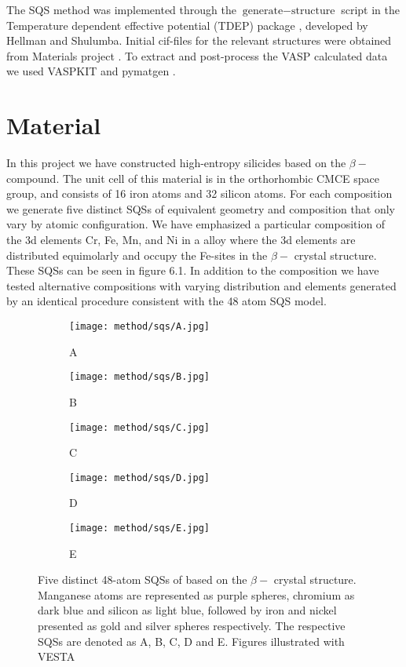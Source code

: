The SQS method was implemented through the $\text{generate}-\text{structure}$ script in the Temperature dependent effective potential (TDEP) package \cite{tdep}, developed by Hellman and Shulumba. Initial cif-files for the relevant structures were obtained from Materials project \cite{Jain2013}. To extract and post-process the VASP calculated data we used VASPKIT \cite{vaspkit} and pymatgen \cite{pymatgen}. 


\section{Material}
In this project we have constructed high-entropy silicides based on the $\beta-$  compound. The unit cell of this material is in the orthorhombic CMCE space group, and consists of 16 iron atoms and 32 silicon atoms. For each composition we generate five distinct SQSs of equivalent geometry and composition that only vary by atomic configuration. We have emphasized a particular composition of the 3d elements Cr, Fe, Mn, and Ni in a  alloy where the 3d elements are distributed equimolarly and occupy the Fe-sites in the $\beta-$  crystal structure. These SQSs can be seen in figure 6.1. In addition to the  composition we have tested alternative compositions with varying distribution and elements generated by an identical procedure consistent with the 48 atom SQS model.

\begin{figure}[H]
\begin{subfigure}{0.5\textwidth}
\texttt{[image: method/sqs/A.jpg]}
\caption{A}
\end{subfigure}
\hfill
\begin{subfigure}{0.5\textwidth}
\texttt{[image: method/sqs/B.jpg]}
\caption{B}
\end{subfigure}
\begin{subfigure}{0.5\textwidth}
\texttt{[image: method/sqs/C.jpg]}
\caption{C}
\end{subfigure}
\hfill
\begin{subfigure}{0.5\textwidth}
\texttt{[image: method/sqs/D.jpg]}
\caption{D}
\end{subfigure}
\begin{subfigure}{0.5\textwidth}
\texttt{[image: method/sqs/E.jpg]}
\caption{E}
\end{subfigure}
\caption{Five distinct 48-atom SQSs of  based on the $\beta-$  crystal structure. Manganese atoms are represented as purple spheres, chromium as dark blue and silicon as light blue, followed by iron and nickel presented as gold and silver spheres respectively. The respective SQSs are denoted as A, B, C, D and E. Figures illustrated with VESTA \cite{vesta}}
\label{sqs_FeSi2}
\end{figure}